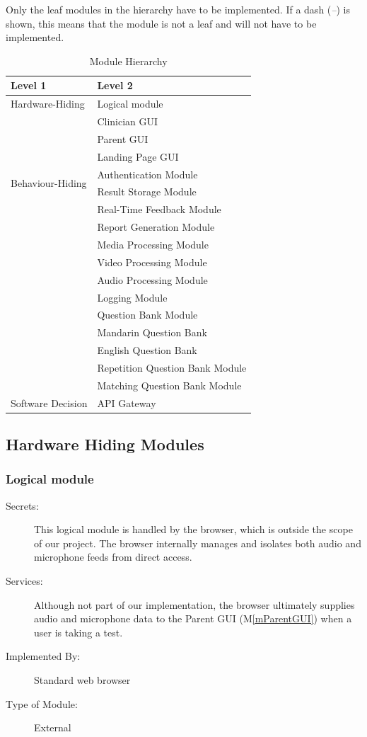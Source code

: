 \documentclass[12pt, titlepage]{article}
\newcommand{\mref}[1]{M\ref{#1}}
\begin{document}
Only the leaf modules in the hierarchy have to be implemented. If a dash
(\emph{--}) is shown, this means that the module is not a leaf and will not have
to be implemented.

\begin{table}[h!]
  \centering
  \begin{tabular}{p{} p{}}
  \toprule
  \textbf{Level 1} & \textbf{Level 2}\\
  \midrule
  
  {Hardware-Hiding} & Logical module \\
  \midrule
  
  \multirow{8}{0.3\textwidth}{Behaviour-Hiding} & Clinician GUI\\
  & Parent GUI\\
  & Landing Page GUI\\
  & Authentication Module\\
  & Result Storage Module\\
  & Real-Time Feedback Module\\ 
  & Report Generation Module\\
  & Media Processing Module\\
  & Video Processing Module\\
  & Audio Processing Module\\
  & Logging Module\\
  & Question Bank Module\\
  & Mandarin Question Bank\\
  & English Question Bank\\
  & Repetition Question Bank Module\\
  & Matching Question Bank Module\\
  \midrule
  
  \multirow{1}{0.3\textwidth}{Software Decision} & API Gateway\\
  \bottomrule
  
  \end{tabular}
  \caption{Module Hierarchy}
  \label{TblMH}
  \end{table}
  \newpage

\subsection{Hardware Hiding Modules}
 \subsubsection{Logical module}
\begin{description}
  \item[Secrets:]
    This logical module is handled by the browser, which is outside the scope of our project.
    The browser internally manages and isolates both audio and microphone feeds from direct access.
  \item[Services:]
    Although not part of our implementation, the browser ultimately supplies audio and microphone data
    to the Parent GUI (\mref{mParentGUI}) when a user is taking a test.
  \item[Implemented By:]
    Standard web browser
  \item[Type of Module:]
    External 
\end{description}
\end{document}

